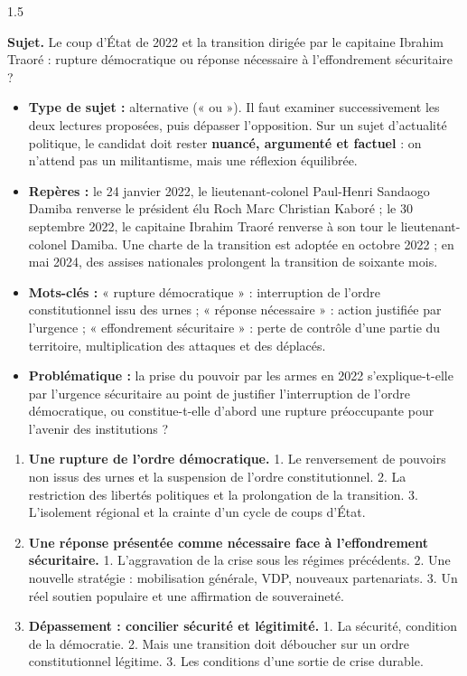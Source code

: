 \documentclass[12pt]{article}
\begin{document}
\begin{spacing}{1.5}

\noindent\textbf{Sujet.} Le coup d'État de 2022 et la transition dirigée par le capitaine Ibrahim Traoré : rupture démocratique ou réponse nécessaire à l'effondrement sécuritaire ?


\begin{itemize}
\item \textbf{Type de sujet :} alternative (« ou »). Il faut examiner successivement les deux lectures proposées, puis dépasser l'opposition. Sur un sujet d'actualité politique, le candidat doit rester \textbf{nuancé, argumenté et factuel} : on n'attend pas un militantisme, mais une réflexion équilibrée.
\item \textbf{Repères :} le 24 janvier 2022, le lieutenant-colonel Paul-Henri Sandaogo Damiba renverse le président élu Roch Marc Christian Kaboré ; le 30 septembre 2022, le capitaine Ibrahim Traoré renverse à son tour le lieutenant-colonel Damiba. Une charte de la transition est adoptée en octobre 2022 ; en mai 2024, des assises nationales prolongent la transition de soixante mois.
\item \textbf{Mots-clés :} « rupture démocratique » : interruption de l'ordre constitutionnel issu des urnes ; « réponse nécessaire » : action justifiée par l'urgence ; « effondrement sécuritaire » : perte de contrôle d'une partie du territoire, multiplication des attaques et des déplacés.
\item \textbf{Problématique :} la prise du pouvoir par les armes en 2022 s'explique-t-elle par l'urgence sécuritaire au point de justifier l'interruption de l'ordre démocratique, ou constitue-t-elle d'abord une rupture préoccupante pour l'avenir des institutions ?
\end{itemize}


\begin{enumerate}
\item[I.] \textbf{Une rupture de l'ordre démocratique.} 1. Le renversement de pouvoirs non issus des urnes et la suspension de l'ordre constitutionnel. 2. La restriction des libertés politiques et la prolongation de la transition. 3. L'isolement régional et la crainte d'un cycle de coups d'État.
\item[II.] \textbf{Une réponse présentée comme nécessaire face à l'effondrement sécuritaire.} 1. L'aggravation de la crise sous les régimes précédents. 2. Une nouvelle stratégie : mobilisation générale, VDP, nouveaux partenariats. 3. Un réel soutien populaire et une affirmation de souveraineté.
\item[III.] \textbf{Dépassement : concilier sécurité et légitimité.} 1. La sécurité, condition de la démocratie. 2. Mais une transition doit déboucher sur un ordre constitutionnel légitime. 3. Les conditions d'une sortie de crise durable.
\end{enumerate}


\end{spacing}
\end{document}
